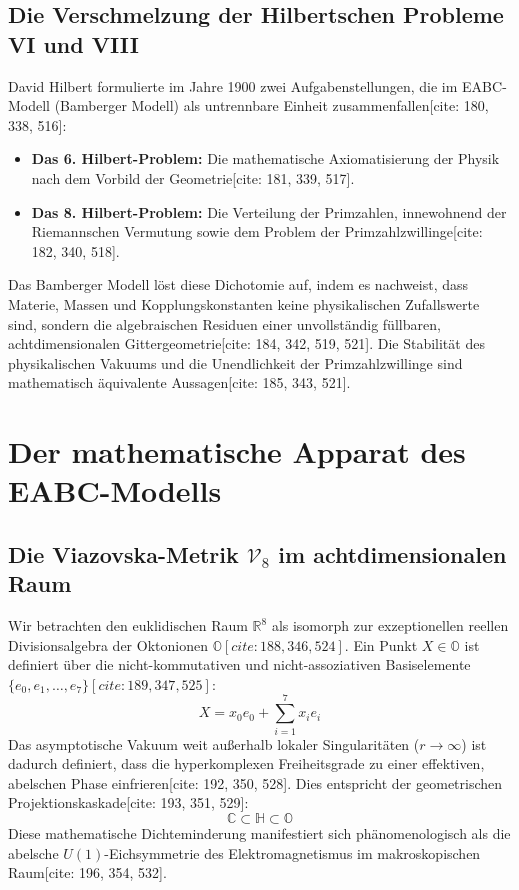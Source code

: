 \documentclass[11pt,a4paper]{article}
\newcommand{\R}{\mathbb{R}}
\newcommand{\C}{\mathbb{C}}
\newcommand{\Halg}{\mathbb{H}}
\newcommand{\Oalg}{\mathbb{O}}
\newcommand{\Vmet}{\mathcal{V}_8}
\theoremstyle{definition}
\begin{document}
	\subsection{Die Verschmelzung der Hilbertschen Probleme VI und VIII}
	David Hilbert formulierte im Jahre 1900 zwei Aufgabenstellungen, die im EABC-Modell (Bamberger Modell) als untrennbare Einheit zusammenfallen[cite: 180, 338, 516]:
	\begin{itemize}
		\item \textbf{Das 6. Hilbert-Problem:} Die mathematische Axiomatisierung der Physik nach dem Vorbild der Geometrie[cite: 181, 339, 517].
		\item \textbf{Das 8. Hilbert-Problem:} Die Verteilung der Primzahlen, innewohnend der Riemannschen Vermutung sowie dem Problem der Primzahlzwillinge[cite: 182, 340, 518].
	\end{itemize}
	Das Bamberger Modell löst diese Dichotomie auf, indem es nachweist, dass Materie, Massen und Kopplungskonstanten keine physikalischen Zufallswerte sind, sondern die algebraischen Residuen einer unvollständig füllbaren, achtdimensionalen Gittergeometrie[cite: 184, 342, 519, 521]. Die Stabilität des physikalischen Vakuums und die Unendlichkeit der Primzahlzwillinge sind mathematisch äquivalente Aussagen[cite: 185, 343, 521].
	
	\section{Der mathematische Apparat des EABC-Modells}
	
	\subsection{Die Viazovska-Metrik $\Vmet$ im achtdimensionalen Raum}
	Wir betrachten den euklidischen Raum $\R^8$ als isomorph zur exzeptionellen reellen Divisionsalgebra der Oktonionen $\Oalg [cite: 188, 346, 524]$. Ein Punkt $X \in \Oalg$ ist definiert über die nicht-kommutativen und nicht-assoziativen Basiselemente $\{e_0, e_1, \dots, e_7\} [cite: 189, 347, 525]$:
	\begin{equation}
		X = x_0 e_0 + \sum_{i=1}^7 x_i e_i
	\end{equation}
	Das asymptotische Vakuum weit außerhalb lokaler Singularitäten ($r \rightarrow \infty$) ist dadurch definiert, dass die hyperkomplexen Freiheitsgrade zu einer effektiven, abelschen Phase einfrieren[cite: 192, 350, 528]. Dies entspricht der geometrischen Projektionskaskade[cite: 193, 351, 529]:
	\begin{equation}
		\C \subset \Halg \subset \Oalg
	\end{equation}
	Diese mathematische Dichteminderung manifestiert sich phänomenologisch als die abelsche $U(1)$-Eichsymmetrie des Elektromagnetismus im makroskopischen Raum[cite: 196, 354, 532].
	
\end{document}
